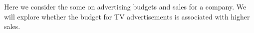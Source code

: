 \begin{itemize}
%
%
%
%

\begin{example}
Here we consider the some on advertising budgets and sales for a company. We will explore whether the budget for TV advertisements is associated with higher sales. \\


\end{example}
\end{itemize}
